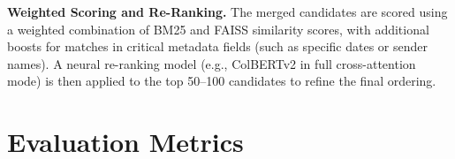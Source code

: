 \documentclass{article}
\begin{document}
\textbf{Weighted Scoring and Re-Ranking.} The merged candidates are scored using a weighted combination of BM25 and FAISS similarity scores, with additional boosts for matches in critical metadata fields (such as specific dates or sender names). A neural re-ranking model (e.g., ColBERTv2 in full cross-attention mode) is then applied to the top 50--100 candidates to refine the final ordering. 


\section{Evaluation Metrics}
\label{metrics}

\small
 

\newpage




\end{document}
